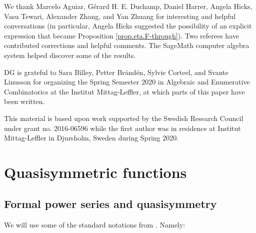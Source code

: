 \documentclass[numbers=enddot,12pt,final,onecolumn,notitlepage]{scrartcl}%
\theoremstyle{definition}
\newenvironment{fineprint}{\begin{small}}{\end{small}}
\begin{document}
We thank Marcelo Aguiar, G\'{e}rard H. E. Duchamp, Daniel Harrer, Angela
Hicks, Vasu Tewari, Alexander Zhang, and Yan Zhuang for interesting and
helpful conversations (in particular, Angela Hicks suggested the possibility
of an explicit expression that became Proposition \ref{prop.eta.F-through}).
Two referees have contributed corrections and helpful comments. The SageMath
computer algebra system \cite{SageMath} helped discover some of the results.

DG is grateful to Sara Billey, Petter Br\"{a}nd\'{e}n, Sylvie Corteel, and
Svante Linusson for organizing the Spring Semester 2020 in Algebraic and
Enumerative Combinatorics at the Institut Mittag-Leffler, at which parts of
this paper have been written.

\begin{fineprint}
This material is based upon work supported by the Swedish Research Council
under grant no. 2016-06596 while the first author was in residence at Institut
Mittag-Leffler in Djursholm, Sweden during Spring 2020.
\end{fineprint}

\section{\label{sec.qsym}Quasisymmetric functions}

\subsection{Formal power series and quasisymmetry}

We will use some of the standard notations from \cite[Chapter 5]{GriRei}. Namely:
\end{document}
